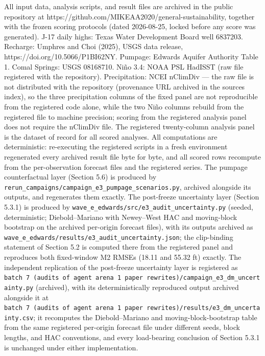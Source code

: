 \documentclass[11pt]{article}
\begin{document}
All input data, analysis scripts, and result files are archived in the
public repository at
https://github.com/MIKEAA2020/general-sustainability, together with the
frozen scoring protocols (dated 2026-08-25, locked before any score was
generated). J-17 daily highs: Texas Water Development Board well
6837203. Recharge: Umphres and Choi (2025), USGS data release,
https://doi.org/10.5066/P1BI62NY. Pumpage: Edwards Aquifer Authority
Table 1. Comal Springs: USGS 08168710. Ni\~no 3.4: NOAA PSL HadISST (raw
file registered with the repository). Precipitation: NCEI nClimDiv ---
the raw file is not distributed with the repository (provenance URL
archived in the sources index), so the three precipitation columns of
the fixed panel are not reproducible from the registered code alone,
while the two Ni\~no columns rebuild from the registered file to machine
precision; scoring from the registered analysis panel does not require
the nClimDiv file. The registered twenty-column analysis panel is the
dataset of record for all scored analyses. All computations are
deterministic: re-executing the registered scripts in a fresh
environment regenerated every archived result file byte for byte, and
all scored rows recompute from the per-observation forecast files and
the registered series. The pumpage counterfactual layer (Section 5.6) is
produced by
\texttt{rerun\_campaigns/campaign\_e3\_pumpage\_scenarios.py}, archived
alongside its outputs, and regenerates them exactly. The post-freeze
uncertainty layer (Section 5.3.1) is produced by
\texttt{wave\_e\_edwards/src/e3\_audit\_uncertainty.py} (seeded,
deterministic; Diebold--Mariano with Newey--West HAC and moving-block
bootstrap on the archived per-origin forecast files), with its outputs
archived as
\texttt{wave\_e\_edwards/results/e3\_audit\_uncertainty.json}; the
clip-binding statement of Section 5.2 is computed there from the
registered panel and reproduces both fixed-window M2 RMSEs (18.11 and
55.32 ft) exactly. The independent replication of the post-freeze
uncertainty layer is registered as
\texttt{batch\ 7\ (audits\ of\ agent\ arena\ 1\ paper\ rewrites)/campaign\_e3\_dm\_uncertainty.py}
(archived), with its deterministically reproduced output archived
alongside it at
\texttt{batch\ 7\ (audits\ of\ agent\ arena\ 1\ paper\ rewrites)/results/e3\_dm\_uncertainty.csv};
it recomputes the Diebold--Mariano and moving-block-bootstrap table from
the same registered per-origin forecast file under different seeds,
block lengths, and HAC conventions, and every load-bearing conclusion of
Section 5.3.1 is unchanged under either implementation.
\end{document}
